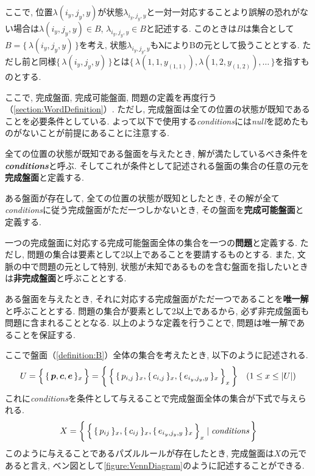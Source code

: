 ここで, 位置$\lambda(i_y,j_y,y)$が状態$\lambda_{i_y,j_y,y}$と一対一対応することより誤解の恐れがない場合は$\lambda(i_y,j_y,y) \in B  $, $\lambda_{i_y,j_y,y}\in B $と記述する.
このときは$B$は集合として$B=\{\,\lambda(i_y,j_y,y)\,\}$を考え, 状態$\lambda_{i_y,j_y,y}$も$\bm{\lambda}$によりBの元として扱うこととする.
ただし前と同様$\{\,\lambda(i_y,j_y,y)\,\}$とは$\{\,\lambda(1,1,y_{(1,1)}), \lambda(1,2,y_{(1,2)}),\ldots\,\}$を指すものとする.



ここで, 完成盤面, 完成可能盤面, 問題の定義を再度行う（\cref{section:WordDefinition}）. ただし, 完成盤面は全ての位置の状態が既知であることを必要条件としている. よって以下で使用する\textit{conditions}には\textit{null}を認めたものがないことが前提にあることに注意する.
\begin{definition}\label{definition:Conditions}
  全ての位置の状態が既知である盤面を与えたとき, 解が満たしているべき条件を\textbf{\textit{conditions}}と呼ぶ. そしてこれが条件として記述される盤面の集合の任意の元を\textbf{完成盤面}と定義する.
\end{definition}

\begin{definition}[完成可能盤面]
  ある盤面が存在して, 全ての位置の状態が既知としたとき, その解が全て\textit{conditions}に従う完成盤面がただ一つしかないとき, その盤面を\textbf{完成可能盤面}と定義する.
\end{definition}

\begin{definition}[問題]
  一つの完成盤面に対応する完成可能盤面全体の集合を一つの\textbf{問題}と定義する. ただし, 問題の集合は要素として2以上であることを要請するものとする. また, 文脈の中で問題の元として特別, 状態が未知であるものを含む盤面を指したいときは\textbf{非完成盤面}と呼ぶこととする.
\end{definition}

ある盤面を与えたとき, それに対応する完成盤面がただ一つであることを\textbf{唯一解}と呼ぶこととする. 問題の集合が要素として2以上であるから, 必ず非完成盤面も問題に含まれることとなる.
以上のような定義を行うことで, 問題は唯一解であることを保証する.

ここで盤面（\cref{definition:B}）全体の集合を考えたとき, 以下のように記述される.
\begin{equation}\label{equation:U}
  U=\Bigl\{\,\{\,\bm{p},\bm{c},\bm{e}\,\}_x\,\Bigr\}=\biggl\{\,\Bigl\{\,\{\,p_{i,j}\,\}_x,\{\,c_{i,j}\,\}_x,\{\,e_{i_y,j_y,y}\,\}_x\,\Bigr\}_x\,\biggr\} \quad (1\le x \le |U|)
\end{equation}
これに\textit{conditions}を条件として与えることで完成盤面全体の集合が下式で与えられる.
\begin{equation}\label{equation:X}
  X=\biggl\{\,\Bigl\{\,\{\,p_{ij}\,\}_x,\{\,c_{ij}\,\}_x,\{\,e_{i_y,j_y,y}\,\}_x\,\Bigr\}_x\mid \rm{\textit{conditions}}\,\biggr\}
\end{equation}
このように与えることであるパズルルールが存在したとき, 完成盤面は$X$の元であると言え, ベン図として\cref{figure:VennDiagram}のように記述することができる.

